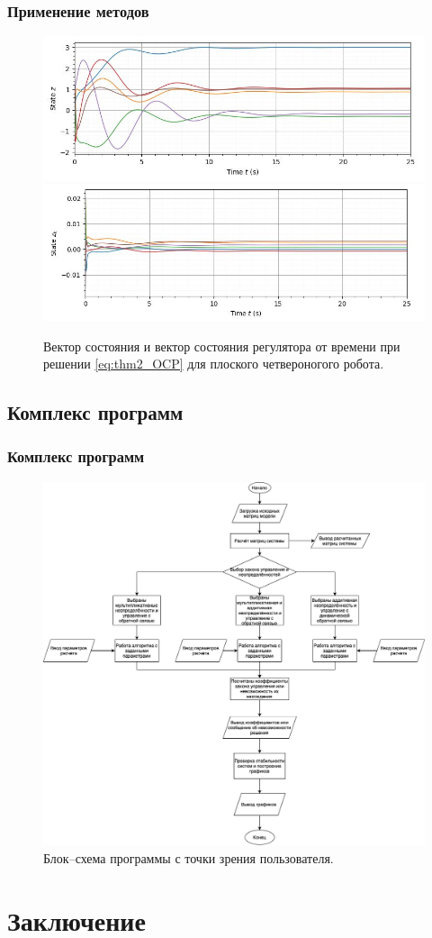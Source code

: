 \begin{frame}
	\frametitle{Применение методов}
	\begin{figure}
		\centering
		\includegraphics[width=0.8\linewidth]{images/output_state_z.JPG}
		\includegraphics[width=0.8\linewidth]{images/output_state_zk.JPG}
		\caption{Вектор состояния и вектор состояния регулятора от времени при решении \eqref{eq:thm2_OCP} для плоского четвероногого робота.}
		\label{fig:output_state_z}
	\end{figure}
\end{frame}

\subsection{Комплекс программ}

\begin{frame}
	\frametitle{Комплекс программ}
	\begin{figure}
	\centering
	\includegraphics[scale=0.2]{images/programm.png}
	\caption{Блок–схема программы с точки зрения пользователя.}
	\label{fig:programm}
\end{figure}
\end{frame}

\section{Заключение}




